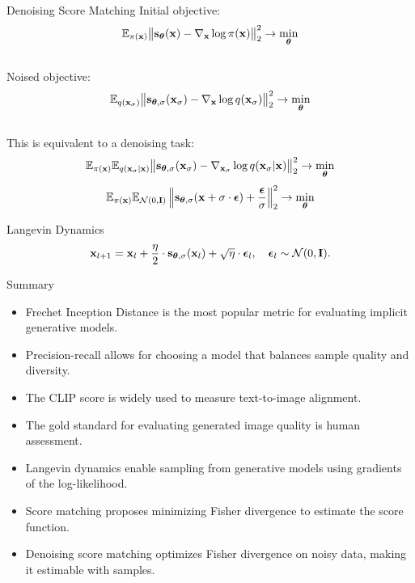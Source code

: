 \documentclass{beamer}
\begin{document}
\begin{frame}{Denoising Score Matching}
	Initial objective:
	\vspace{-0.2cm}
	\[
		\mathbb{E}_{\pi(\mathbf{x})}\big\| \mathbf{s}_{\boldsymbol{\theta}}(\mathbf{x}) - \nabla_{\mathbf{x}} \log \pi(\mathbf{x}) \big\|^2_2 \rightarrow \min_{\boldsymbol{\theta}}
	\]
	\eqpause
	\vspace{-0.5cm} \\
	Noised objective:
	\vspace{-0.2cm}
	\[
		\mathbb{E}_{q(\mathbf{x}_{\sigma})}\big\| \mathbf{s}_{\boldsymbol{\theta}, \sigma}(\mathbf{x}_\sigma) - \nabla_{\mathbf{x}} \log q(\mathbf{x}_{\sigma}) \big\|^2_2 \rightarrow \min_{\boldsymbol{\theta}}
	\]
	\eqpause
	\vspace{-0.5cm} \\
	This is equivalent to a denoising task:
	\vspace{-0.2cm}
	\[
		\mathbb{E}_{\pi(\mathbf{x})} \mathbb{E}_{q(\mathbf{x}_{\sigma} | \mathbf{x})}\big\| \mathbf{s}_{\boldsymbol{\theta}, \sigma}(\mathbf{x}_{\sigma}) - \nabla_{\mathbf{x}_{\sigma}} \log q(\mathbf{x}_{\sigma} | \mathbf{x}) \big\|^2_2 \rightarrow \min_{\boldsymbol{\theta}}
	\]
	\eqpause
	\vspace{-0.3cm}
	\[
		\mathbb{E}_{\pi(\mathbf{x})} \mathbb{E}_{\mathcal{N}(0, \mathbf{I})}\left\| \mathbf{s}_{\boldsymbol{\theta}, \sigma}(\mathbf{x} + \sigma \cdot \boldsymbol{\epsilon}) + \frac{\boldsymbol{\epsilon}}{\sigma} \right\|^2_2 \rightarrow \min_{\boldsymbol{\theta}}
	\]
	\vspace{-0.5cm}
	\begin{block}{Langevin Dynamics}
		\vspace{-0.3cm}
		\[
			\mathbf{x}_{l + 1} = \mathbf{x}_l + \frac{\eta}{2} \cdot \mathbf{s}_{\boldsymbol{\theta}, \sigma}(\mathbf{x}_l) + \sqrt{\eta} \cdot \boldsymbol{\epsilon}_l, \quad \boldsymbol{\epsilon}_l \sim \mathcal{N}(0, \mathbf{I}).
		\]
		\vspace{-0.7cm}
	\end{block}
\end{frame}
\begin{frame}{Summary}
	\begin{itemize}
		\item Frechet Inception Distance is the most popular metric for evaluating implicit generative models.
		\vfill
		\item Precision-recall allows for choosing a model that balances sample quality and diversity.
		\vfill
		\item The CLIP score is widely used to measure text-to-image alignment.
		\vfill
		\item The gold standard for evaluating generated image quality is human assessment.
		\vfill
		\item Langevin dynamics enable sampling from generative models using gradients of the log-likelihood.
		\vfill
		\item Score matching proposes minimizing Fisher divergence to estimate the score function.
		\vfill
		\item Denoising score matching optimizes Fisher divergence on noisy data, making it estimable with samples.
	\end{itemize}
\end{frame}
\end{document}
